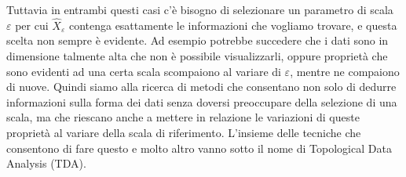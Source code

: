 Tuttavia in entrambi questi casi c'è bisogno di selezionare un parametro di scala $\varepsilon$ per cui $\widehat{X}_\varepsilon$ contenga esattamente le informazioni che vogliamo trovare, e questa scelta non sempre è evidente. Ad esempio potrebbe succedere che i dati sono in dimensione talmente alta che non è possibile visualizzarli, oppure proprietà che sono evidenti ad una certa scala scompaiono al variare di $\varepsilon$, mentre ne compaiono di nuove. Quindi siamo alla ricerca di metodi che consentano non solo di dedurre informazioni sulla forma dei dati senza doversi preoccupare della selezione di una scala, ma che riescano anche a mettere in relazione le variazioni di queste proprietà al variare della scala di riferimento. L'insieme delle tecniche che consentono di fare questo e molto altro vanno sotto il nome di Topological Data Analysis (TDA).
